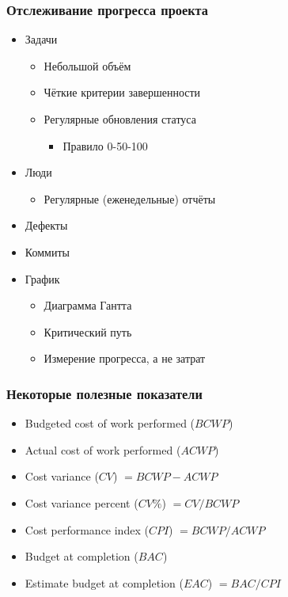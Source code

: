 \documentclass{../../slides-style}
\begin{document}
    \begin{frame}
        \frametitle{Отслеживание прогресса проекта}
        \begin{itemize}
            \item Задачи
            \begin{itemize}
                \item Небольшой объём
                \item Чёткие критерии завершенности
                \item Регулярные обновления статуса
                \begin{itemize}
                    \item Правило 0-50-100
                \end{itemize}
            \end{itemize}
            \item Люди
            \begin{itemize}
                \item Регулярные (еженедельные) отчёты 
            \end{itemize}
            \item Дефекты
            \item Коммиты
            \item График
            \begin{itemize}
                \item Диаграмма Гантта
                \item Критический путь
                \item Измерение прогресса, а не затрат
            \end{itemize}
        \end{itemize}
    \end{frame}

    \begin{frame}
        \frametitle{Некоторые полезные показатели}
        \begin{itemize}
            \item Budgeted cost of work performed ($BCWP$)
            \item Actual cost of work performed ($ACWP$)
            \item Cost variance ($CV$) $= BCWP - ACWP$
            \item Cost variance percent ($CV\%$) $= CV / BCWP$
            \item Cost performance index ($CPI$) $= BCWP / ACWP$
            \item Budget at completion ($BAC$)
            \item Estimate budget at completion ($EAC$) $= BAC / CPI$
        \end{itemize}
    \end{frame}
\end{document}

